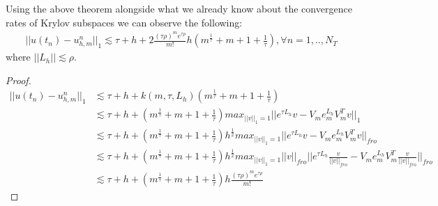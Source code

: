\begin{corollary}
    Using the above theorem alongside what we already know about the convergence rates of Krylov subspaces we can observe the following:
    \begin{align*}
        ||u(t_n) - u_{h,m}^n||_1 \lesssim \tau + h + 2 \frac{(\tau \rho)^m e^{\tau \rho}}{m!}h(m^\frac{1}{\tau} + m + 1 + \frac{1}{\tau}), \forall n = 1,..,N_T
    \end{align*}
    where $||L_h|| \lesssim \rho$.
\end{corollary}
\begin{proof}
    \begin{align*}
        ||u(t_n) - u_{h,m}^n||_1 &\lesssim \tau + h + k(m,\tau, L_h)(m^\frac{1}{\tau} + m + 1 + \frac{1}{\tau})\\
        &\lesssim \tau + h + (m^\frac{1}{\tau} + m + 1 + \frac{1}{\tau})max_{||v||_1=1}||e^{\tau L_h}v - V_m e_m^{L_h}V^T_mv||_1\\
        &\lesssim \tau + h + (m^\frac{1}{\tau} + m + 1 + \frac{1}{\tau})h^{\frac12}max_{||v||_1=1}||e^{\tau L_h}v - V_m e_m^{L_h}V^T_mv||_{fro}\\
        &\lesssim \tau + h + (m^\frac{1}{\tau} + m + 1 + \frac{1}{\tau})h^{\frac12}max_{||v||_1=1}||v||_{fro}||e^{\tau L_h}\frac{v}{||v||_{fro}} - V_m e_m^{L_h}V^T_m\frac{v}{||v||_{fro}}||_{fro}\\
        &\lesssim \tau + h + (m^\frac{1}{\tau} + m + 1 + \frac{1}{\tau})h \frac{(\tau \rho)^m e^{\tau \rho}}{m!}
    \end{align*}
\end{proof}